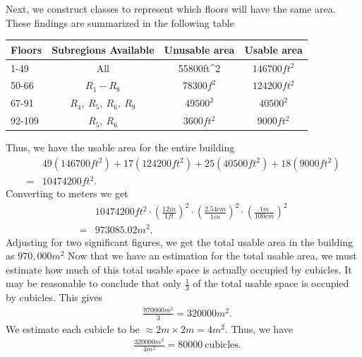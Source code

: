 \documentclass{report}
\begin{document}
    \bigbreak \noindent 
    Next, we construct classes to represent which floors will have the same area. These findings are summarized in the following table
    \bigbreak \noindent 
    \begin{center}
        \begin{center}
            \begin{tabular}{l|c|c|c}
            Floors & Subregions Available & Unusable area &Usable area \\
            	\hline
            1-49 & All & 55800ft^{2} & $146700ft^{2}$  \\
            50-66 & $R_{1} - R_{8}$ & $78300f^{2}$&  $124200ft^{2}$\\
            67-91 & $R_{4},\ R_{5},\ R_{6},\ R_{9}$& $49500^{2}$ & $40500^{2}$ \\
            92-109 & $R_{5},\ R_{6} $ &$3600ft^{2}$ &$9000ft^{2} $
            \end{tabular}
        \end{center}
    \end{center}
    \bigbreak \noindent 
    Thus, we have the usable area for the entire building
    \begin{align*}
        &49(146700ft^{2}) + 17(124200ft^{2}) + 25(40500ft^{2}) + 18(9000ft^{2}) \\
        =&10474200ft^{2}
    .\end{align*}
    Converting to meters we get
    \begin{align*}
        &10474200ft^{2} \cdot \left(\frac{12in}{1ft}\right)^{2} \cdot \left(\frac{2.54cm}{1in}\right)^{2} \cdot \left(\frac{1m}{100cm}\right)^{2} \\ 
        =&973085.02m^{2}
    .\end{align*}
    Adjusting for two significant figures, we get the total usable area in the building as $970,000m^{2}$
    \bigbreak \noindent 
    Now that we have an estimation for the total usable area, we must estimate how much of this total usable space is actually occupied by cubicles. It may be reasonable to conclude that only $\frac{1}{3}$ of the total usable space is occupied by cubicles. This gives
    \begin{align*}
        &\frac{970000m^{2}}{3} = 320000m^{2}
    .\end{align*}
    \bigbreak \noindent 
    We estimate each cubicle to be $\approx 2m \times 2m = 4m^{2}$. Thus, we have
    \begin{align*}
        &\frac{320000m^{2}}{4m^{2}} = 80000\ \text{cubicles}
    .\end{align*}
\end{document}
